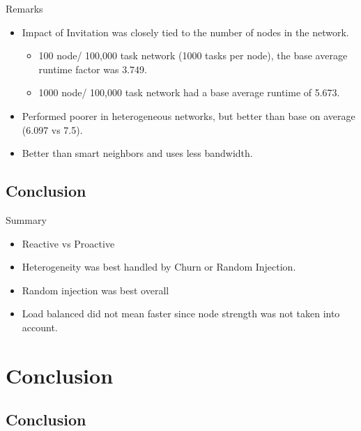 \documentclass[11pt]{beamer}
\begin{document}


\begin{frame}{Remarks}
	\begin{itemize}
		\item Impact of Invitation was closely tied to the number of nodes in the network.
		\begin{itemize}
			\item 100 node/ 100,000 task network (1000 tasks per node), the base average runtime factor was 3.749.
			\item 1000 node/ 100,000 task network had a base average runtime of 5.673.
		\end{itemize}
		\item Performed poorer in heterogeneous networks, but better than base on average (6.097 vs 7.5).
		\item Better than smart neighbors and uses less bandwidth.
	\end{itemize}
\end{frame}

\subsection{Conclusion}

\begin{frame}{Summary}
	\begin{itemize}
		
		\item Reactive vs Proactive
		\item Heterogeneity was best handled by Churn or Random Injection.
		\item Random injection was best overall
		\item Load balanced did not mean faster since node strength was not taken into account.
	\end{itemize}
\end{frame}

\section{Conclusion}

\subsection{Conclusion}
\end{document}
